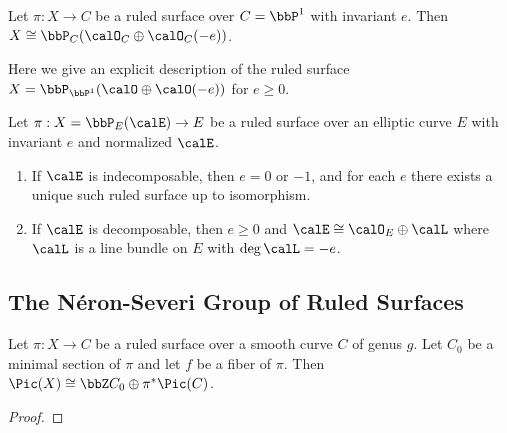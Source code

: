     \begin{theorem}\label{thm:classification_of_ruled_surface_on_P1}
        Let \(\pi:X \to C\) be a ruled surface over \(C = \bbP^1\) with invariant \(e\).
        Then \(X \cong \bbP_{C}(\calO_C \oplus \calO_C(-e))\).
    \end{theorem}

    \begin{example}\label{eg:explicit_description_of_rational_ruled_surface}
        Here we give an explicit description of the ruled surface \(X = \bbP_{\bbP^1}(\calO \oplus \calO(-e))\) for \(e \geq 0\).
    \end{example}

    \begin{theorem}\label{thm:classification_of_ruled_surface_on_elliptic_curve}
        Let \(\pi:X = \bbP_E(\calE) \to E\) be a ruled surface over an elliptic curve \(E\) with invariant \(e\) and normalized \(\calE\). 
        \begin{enumerate}
            \item If \(\calE\) is indecomposable, then \(e = 0\) or \(-1\), and for each \(e\) there exists a unique such ruled surface up to isomorphism.
            \item If \(\calE\) is decomposable, then \(e \geq 0\) and \(\calE \cong \calO_E \oplus \calL\) where \(\calL\) is a line bundle on \(E\) with \(\deg \calL = -e\).
        \end{enumerate}
    \end{theorem}

    \begin{example}
    \end{example}


\subsection{The N\'eron-Severi Group of Ruled Surfaces}

    \begin{proposition}\label{prop:Picard_group_of_ruled_surface}
        Let \(\pi:X \to C\) be a ruled surface over a smooth curve \(C\) of genus \(g\). 
        Let \(C_0\) be a minimal section of \(\pi\) and let \(f\) be a fiber of \(\pi\). 
        Then \(\Pic(X) \cong \bbZ C_0 \oplus \pi^*\Pic(C)\).
    \end{proposition}
    \begin{proof}
    \end{proof}

